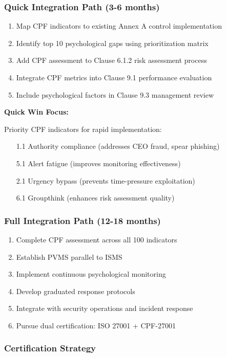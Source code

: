 \documentclass[11pt,a4paper]{article}
\begin{document}
\subsubsection{Quick Integration Path (3-6 months)}

\begin{enumerate}
\item Map CPF indicators to existing Annex A control implementation
\item Identify top 10 psychological gaps using prioritization matrix
\item Add CPF assessment to Clause 6.1.2 risk assessment process
\item Integrate CPF metrics into Clause 9.1 performance evaluation
\item Include psychological factors in Clause 9.3 management review
\end{enumerate}

\textbf{Quick Win Focus:}

Priority CPF indicators for rapid implementation:
\begin{itemize}
\item [1.1] Authority compliance (addresses CEO fraud, spear phishing)
\item [5.1] Alert fatigue (improves monitoring effectiveness)
\item [2.1] Urgency bypass (prevents time-pressure exploitation)
\item [6.1] Groupthink (enhances risk assessment quality)
\end{itemize}

\subsubsection{Full Integration Path (12-18 months)}

\begin{enumerate}
\item Complete CPF assessment across all 100 indicators
\item Establish PVMS parallel to ISMS
\item Implement continuous psychological monitoring
\item Develop graduated response protocols
\item Integrate with security operations and incident response
\item Pursue dual certification: ISO 27001 + CPF-27001
\end{enumerate}

\subsubsection{Certification Strategy}
\end{document}
